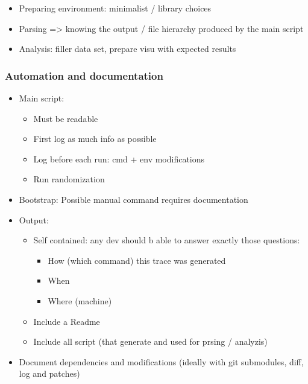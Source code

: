 \begin{itemize}
    \item Preparing environment: minimalist / library choices
    \item Parsing => knowing the output / file hierarchy produced by the main script
    \item Analysis: filler data set, prepare visu with expected results
\end{itemize}

\subsubsection{Automation and documentation}

\begin{itemize}
    \item Main script:
        \begin{itemize}
            \item Must be readable
            \item First log as much info as possible
            \item Log before each run: cmd + env modifications
            \item Run randomization
        \end{itemize}
    \item Bootstrap: Possible manual command requires documentation
    \item Output:
        \begin{itemize}
            \item Self contained: any dev should b able to answer exactly those questions:
                \begin{itemize}
                    \item How (which command) this trace was generated
                    \item When
                    \item Where (machine)
                \end{itemize}
            \item Include a Readme
            \item Include all script (that generate and used for prsing / analyzis)
        \end{itemize}
    \item Document dependencies and modifications (ideally with git submodules, diff, log and patches)
\end{itemize}

